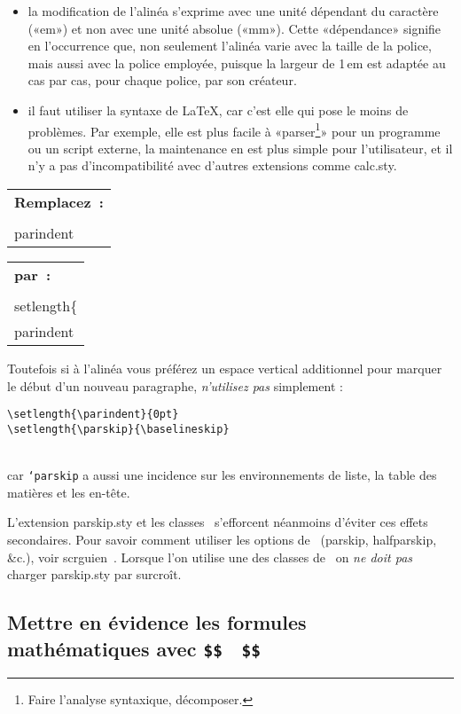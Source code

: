 \documentclass[fontsize=11pt, paper=a4, pagesize, captions=tableheading, numbers=enddot, toc=graduated, footnotes=multiple]{scrartcl}%
\makeatletter
\DeclareRobustCommand*{\Macro}[1]{\mbox{\texttt{\char`\\#1}}}
\DeclareRobustCommand*{\LMacro}[2]{\mbox{\texttt{\char`\\#1\{#2\}}}}
\newcommand{\Doku}[1]{\textsf{#1}\xspace}
\newcommand{\Paket}[1]{\textsf{#1.sty}\xspace}
\newcommand{\Option}[1]{\textsf{#1}\xspace}
\newenvironment{Ers}[1][\linewidth]{%
  \par\bigskip\noindent\marginline{\textcolor{gruen}{\boldmath $\triangleright$}}\begin{tabular}[t]{@{}p{0.5\textwidth}@{}}\textcolor{rot}{\textbf{\textsf{Remplacez~:}}%
}\\[2pt] \rahmenpr[#1]}%
{\endrahmenpr\end{tabular}}
\newenvironment{Dur}[1][0.5\textwidth]{%
\noindent\begin{tabular}[t]{@{}p{0.5\textwidth - 0.5em}@{}}\textcolor{gruen}{\textbf{\textsf{par~:}}}\\[2pt]\rahmenpg[#1]}%
{\endrahmenpg\end{tabular}\smallskip\noindent}
\newenvironment{Schlecht}[1][\linewidth]{%
  \par\medskip\rahmenpr[#1]}%
{\endrahmenpr\par\noindent}
\makeatother
\begin{document}
\begin{itemize}
\item la modification de l’alinéa s’exprime avec une unité dépendant du caractère («em») et non avec une unité absolue («mm»). Cette «dépendance» signifie en l’occurrence que, non seulement l’alinéa varie avec la taille de la police, mais aussi avec la police employée, puisque la largeur de 1\,em est adaptée au cas par cas, pour chaque police, par son créateur.

\item il faut utiliser la syntaxe de \LaTeX{}, car c’est elle qui pose le moins de problèmes. Par exemple, elle est plus facile à «parser\footnote{Faire l’analyse syntaxique, décomposer.}» pour un programme ou un script externe, la maintenance en est plus simple pour l’utilisateur, et il n’y a pas d’incompatibilité avec d’autres extensions comme \Paket{calc}.
\end{itemize}
  \begin{Ers}
    \Macro{parindent}\texttt{=1em}
  \end{Ers}
\begin{Dur}
    \LMacro{setlength}{\Macro{parindent}\}\{1em}
  \end{Dur}
Toutefois si à l'alinéa vous préférez un espace vertical additionnel pour marquer le début d'un nouveau paragraphe, \emph{n'utilisez pas} simplement :

\begin{Schlecht}
\begin{verbatim}
\setlength{\parindent}{0pt}
\setlength{\parskip}{\baselineskip}
\end{verbatim}
\end{Schlecht}%
\vspace{0.2ex}\\
car \Macro{parskip} a aussi une incidence sur les environnements de liste, la table des matières et les en-tête.

L'extension \Paket{parskip}et les classes \KOMAScript\ s'efforcent néanmoins d'éviter ces effets secondaires. Pour savoir comment utiliser les options de \KOMAScript\ (\Option{parskip}, \Option{halfparskip}, \&c.), voir \Doku{scrguien}~\cite{kohm-12}. Lorsque l'on utilise une des classes de \KOMAScript\, on \emph{ne doit pas} charger \Paket{parskip} par surcroît.

\subsection{Mettre en évidence les formules mathématiques avec \texttt{\$\$\,\textellipsis\,\$\$}}
\label{sec:abges-form-mit}
\end{document}

